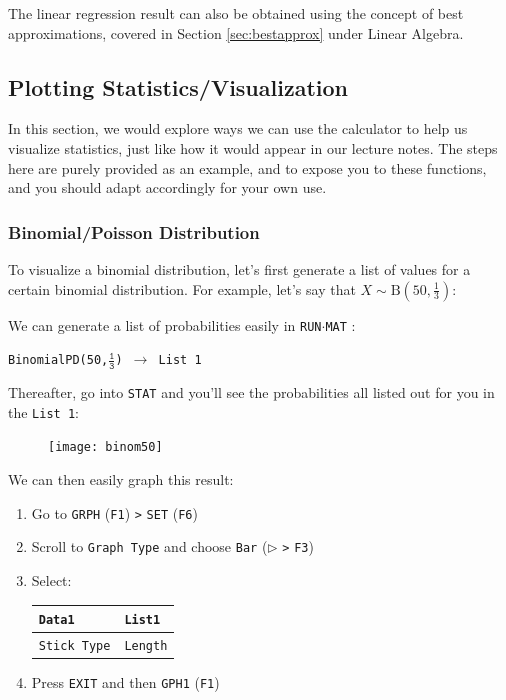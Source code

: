 \documentclass[a5paper]{memoir}
\def\code#1{\texttt{#1}}
\def\runmat{\code{RUN$\cdot$MAT} }
\def\Fone{(\code{F1}) }
\def\fone{(\code{F1})}
\def\fsix{(\code{F6})}
\begin{document}
The linear regression result can also be obtained using the concept of best approximations, covered in Section \ref{sec:bestapprox} under Linear Algebra.

\subsection{Plotting Statistics/Visualization} \label{sec:plotstat}
In this section, we would explore ways we can use the calculator to help us visualize statistics, just like how it would appear in our lecture notes. The steps here are purely provided as an example, and to expose you to these functions, and you should adapt accordingly for your own use.

\subsubsection{Binomial/Poisson Distribution}
To visualize a binomial distribution, let's first generate a list of values for a certain binomial distribution. For example, let's say that $X \sim \text{B}(50, \frac{1}{3})$:

We can generate a list of probabilities easily in \runmat:

\begin{center}
	\code{BinomialPD(50,$\mathtt{\frac{1}{3}}$) $\mathtt{\rightarrow}$ List 1}
\end{center}

Thereafter, go into \code{STAT} and you'll see the probabilities all listed out for you in the \code{List 1}:

\begin{figure}[h]
	\centering
	\texttt{[image: binom50]}
\end{figure}

We can then easily graph this result:
\begin{enumerate}
	\item Go to \code{GRPH} \Fone \code{>} \code{SET} \fsix
	\item Scroll to \code{Graph Type} and choose \code{Bar} ($\triangleright$ \code{>} \code{F3})
	\item Select:
	\begin{tabular}{| l | l |}
		\hline
		\code{Data1} 		& \code{List1} \\
		\hline
		\code{Stick Type} 	& \code{Length} \\
		\hline
	\end{tabular}
	\item Press \code{EXIT} and then \code{GPH1} \fone
\end{enumerate}
\end{document}

